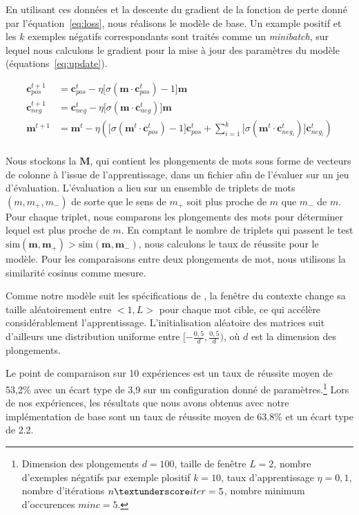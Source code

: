 \documentclass[12pt]{article}
\begin{document}
En utilisant ces données et la descente du gradient de la fonction de perte donné par l'équation~\ref{eq:loss}, nous réalisons le modèle de base. Un example positif et les $k$ exemples négatifs correspondants sont traités comme un \textit{minibatch}, sur lequel nous calculons le gradient pour la mise à jour des paramètres du modèle (équations~\ref{eq:update}). 

\begin{equation}\label{eq:update}
\begin{split}
    \mathbf{c}_{pos}^{t+1} & = \mathbf{c}_{pos}^t - \eta \lbrack \sigma(\mathbf{m} \cdot \mathbf{c}_{pos}^t) - 1 \rbrack \mathbf{m} \\
    \mathbf{c}_{neg}^{t+1} & = \mathbf{c}_{neg}^t - \eta \lbrack \sigma(\mathbf{m} \cdot \mathbf{c}_{neg}^t)\rbrack \mathbf{m} \\
    \mathbf{m}^{t+1} & = \mathbf{m}^t - \eta (\lbrack \sigma(\mathbf{m}^t \cdot \mathbf{c}_{pos}^t) - 1\rbrack \mathbf{c}_{pos}^t + \sum_{i=1}^k \lbrack \sigma(\mathbf{m}^t \cdot \mathbf{c}_{neg_i}^t) \rbrack \mathbf{c}_{neg_i}^t) \\
\end{split}
\end{equation}

Nous stockons la $\mathbf{M}$, qui contient les plongements de mots sous forme de vecteurs de colonne à l'issue de l'apprentissage, dans un fichier afin de l'évaluer sur un jeu d'évaluation. L'évaluation a lieu sur un ensemble de triplets de mots $(m, m_+, m_-)$ de sorte que le sens de $m_+$ soit plus proche de $m$ que $m_-$ de $m$. Pour chaque triplet, nous comparons les plongements des mots pour déterminer lequel est plus proche de $m$. En comptant le nombre de triplets qui passent le test $ \text{sim}(\mathbf{m}, \mathbf{m}_+) > \text{sim}(\mathbf{m}, \mathbf{m}_-)$, nous calculons le taux de réussite pour le modèle. Pour les comparaisons entre deux plongements de mot, nous utilisons la similarité cosinus comme mesure. 

Comme notre modèle suit les spécifications de \cite{DBLP:journals/corr/abs-1301-3781}, la fenêtre du contexte change sa taille aléatoirement entre $<1, L>$ pour chaque mot cible, ce qui accélère considérablement l'apprentissage. L'initialisation aléatoire des matrices suit d'ailleurs une distribution uniforme entre $[-\frac{0{,}5}{d}, \frac{0{,}5}{d})$, où $d$ est la dimension des plongements.

Le point de comparaison sur 10 expériences est un taux de réussite moyen de 53{,}2\% avec un écart type de 3{,}9 sur un configuration donné de paramètres.\footnote{Dimension des plongements $d=100$, taille de fenêtre $L=2$, nombre d'exemples négatifs par exemple plositif $k=10$, taux d'apprentissage $\eta=0{,}1$, nombre d'itérations $n\textunderscore iter=5$, nombre minimum d'occurences $minc=5$.} Lors de nos expériences, les résultats que nous avons obtenus avec notre implémentation de base sont un taux de réussite moyen de 63.8\% et un écart type de 2.2.
\end{document}
